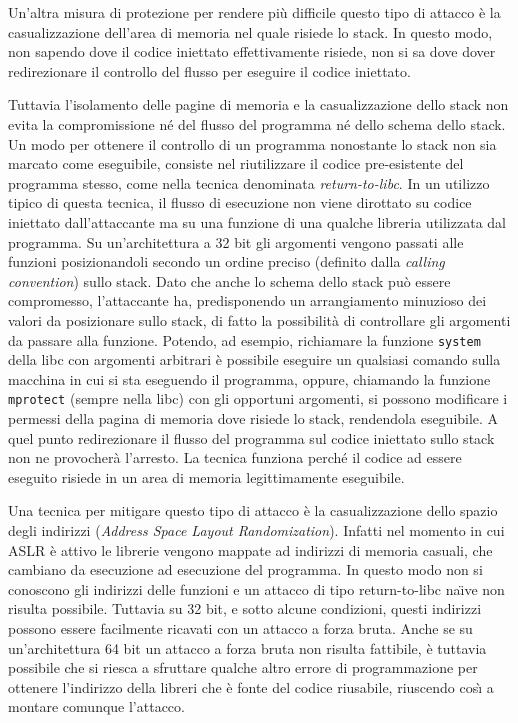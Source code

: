 Un'altra misura di protezione per rendere pi\`{u} difficile questo tipo di
attacco \`{e} la casualizzazione dell'area di memoria nel quale
risiede lo stack. In questo modo, non sapendo dove il codice iniettato
effettivamente risiede, non si sa dove dover redirezionare il
controllo del flusso per eseguire il codice iniettato.

Tuttavia l'isolamento delle pagine di memoria e la casualizzazione
dello stack non evita la compromissione n\'{e} del flusso del programma n\'{e}
dello schema dello stack. Un modo per ottenere il controllo di un
programma nonostante lo stack non sia marcato come eseguibile, consiste
nel riutilizzare il codice pre-esistente del programma stesso, come nella tecnica
denominata \emph{return-to-libc}\cite{c0ntex,
  solar-return-to-libc}. In un utilizzo tipico di questa tecnica, il
flusso di esecuzione non viene dirottato su codice iniettato
dall'attaccante ma su una funzione di una qualche libreria utilizzata
dal programma. Su un'architettura a 32 bit gli argomenti vengono
passati alle funzioni posizionandoli secondo un ordine preciso
(definito dalla \emph{calling convention}) sullo stack. Dato che anche
lo schema dello stack pu\`{o} essere compromesso, l'attaccante ha,
predisponendo un arrangiamento minuzioso dei valori da posizionare sullo stack, di fatto la
possibilit\`{a} di controllare gli argomenti da passare alla
funzione. Potendo, ad esempio, richiamare la funzione
\lstinline{system} della libc con argomenti arbitrari \`{e} possibile
eseguire un qualsiasi comando sulla macchina in cui si sta eseguendo
il programma, oppure, chiamando la funzione \lstinline{mprotect}
(sempre nella libc) con gli opportuni argomenti, si possono modificare
i permessi della pagina di memoria dove risiede lo stack, rendendola
eseguibile. A quel punto redirezionare il flusso del programma sul
codice iniettato sullo stack non ne provocher\`{a} l'arresto. La tecnica
funziona perch\'{e} il codice ad essere eseguito risiede in un area di
memoria legittimamente eseguibile.

Una tecnica per mitigare questo tipo di attacco \`{e} la casualizzazione
dello spazio degli indirizzi (\emph{Address Space Layout
  Randomization}). Infatti nel momento in cui ASLR \`{e} attivo le
librerie vengono mappate ad indirizzi di memoria casuali, che cambiano
da esecuzione ad esecuzione del programma. In questo modo non si
conoscono gli indirizzi delle funzioni e un attacco di tipo
return-to-libc na\"{\i}ve non risulta possibile. Tuttavia su 32 bit, e sotto
alcune condizioni, questi indirizzi possono essere facilmente ricavati
con un attacco a forza bruta\cite{Shacham:2004}. Anche se su
un'architettura 64 bit un attacco a forza bruta non risulta fattibile, \`{e}
tuttavia possibile che si riesca a sfruttare qualche altro errore di
programmazione per ottenere l'indirizzo della libreri che \`{e} fonte del codice riusabile, 
riuscendo cos\`{\i} a montare comunque l'attacco.

